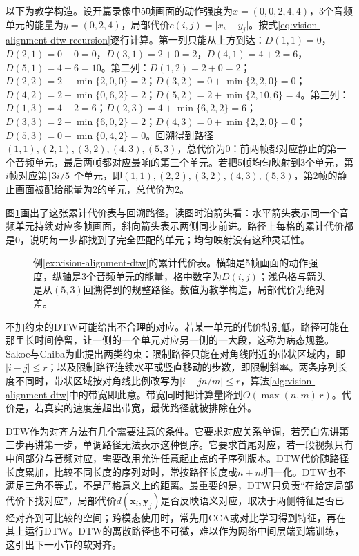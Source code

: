 \begin{example}[动作强度与音频能量的规整]
  \label{ex:vision-alignment-dtw}
  以下为教学构造。设开篇录像中5帧画面的动作强度为$x=(0,0,2,4,4)$，3个音频单元的能量为$y=(0,2,4)$，局部代价$c(i,j)=\lvert x_i-y_j\rvert$。按式\eqref{eq:vision-alignment-dtw-recursion}逐行计算。第一列只能从上方到达：$D(1,1)=0$，$D(2,1)=0+0=0$，$D(3,1)=2+0=2$，$D(4,1)=4+2=6$，$D(5,1)=4+6=10$。第二列：$D(1,2)=2+0=2$；$D(2,2)=2+\min\{2,0,0\}=2$；$D(3,2)=0+\min\{2,2,0\}=0$；$D(4,2)=2+\min\{0,6,2\}=2$；$D(5,2)=2+\min\{2,10,6\}=4$。第三列：$D(1,3)=4+2=6$；$D(2,3)=4+\min\{6,2,2\}=6$；$D(3,3)=2+\min\{6,0,2\}=2$；$D(4,3)=0+\min\{2,2,0\}=0$；$D(5,3)=0+\min\{0,4,2\}=0$。回溯得到路径$(1,1),(2,1),(3,2),(4,3),(5,3)$，总代价为0：前两帧都对应静止的第一个音频单元，最后两帧都对应最响的第三个单元。若把5帧均匀映射到3个单元，第$i$帧对应第$\lceil 3i/5\rceil$个单元，即$(1,1),(2,2),(3,2),(4,3),(5,3)$，第2帧的静止画面被配给能量为2的单元，总代价为2。
\end{example}

图\ref{fig:vision-alignment-dtw-path}画出了这张累计代价表与回溯路径。读图时沿箭头看：水平箭头表示同一个音频单元持续对应多帧画面，斜向箭头表示两侧同步前进。路径上每格的累计代价都是0，说明每一步都找到了完全匹配的单元；均匀映射没有这种灵活性。

\begin{figure}[htbp]
  \centering
  
  \caption{例\ref{ex:vision-alignment-dtw}的累计代价表。横轴是5帧画面的动作强度，纵轴是3个音频单元的能量，格中数字为$D(i,j)$；浅色格与箭头是从$(5,3)$回溯得到的规整路径。数值为教学构造，局部代价为绝对差。}
  \label{fig:vision-alignment-dtw-path}
\end{figure}

不加约束的DTW可能给出不合理的对应。若某一单元的代价特别低，路径可能在那里长时间停留，让一侧的一个单元对应另一侧的一大段，这称为病态规整。Sakoe与Chiba为此提出两类约束：限制路径只能在对角线附近的带状区域内，即$\lvert i-j\rvert\leq r$；以及限制路径连续水平或竖直移动的步数，即限制斜率。两条序列长度不同时，带状区域按对角线比例改写为$\lvert i-jn/m\rvert\leq r$，算法\ref{alg:vision-alignment-dtw}中的带宽即此意。带宽同时把计算量降到$O(\max(n,m)\,r)$。代价是，若真实的速度差超出带宽，最优路径就被排除在外。

DTW作为对齐方法有几个需要注意的条件。它要求对应关系单调，若旁白先讲第三步再讲第一步，单调路径无法表示这种倒序。它要求首尾对应，若一段视频只有中间部分与音频对应，需要改用允许任意起止点的子序列版本。DTW代价随路径长度累加，比较不同长度的序列对时，常按路径长度或$n+m$归一化。DTW也不满足三角不等式，不是严格意义上的距离。最重要的是，DTW只负责“在给定局部代价下找对应”，局部代价$d(\bm x_i,\bm y_j)$是否反映语义对应，取决于两侧特征是否已经对齐到可比较的空间；跨模态使用时，常先用CCA或对比学习得到特征，再在其上运行DTW。DTW的离散路径也不可微，难以作为网络中间层端到端训练，这引出下一小节的软对齐。

